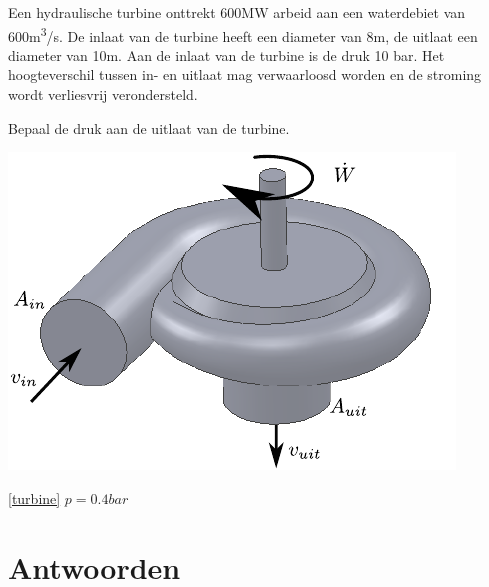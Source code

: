 \begin{toepassing}[*]
	\label{turbine}
Een hydraulische turbine onttrekt 600MW arbeid aan een waterdebiet van 600\unit{m^3/s}. De inlaat van de turbine heeft een diameter van 8m, de uitlaat een diameter van 10m. Aan de inlaat van de turbine is de druk 10 bar. Het hoogteverschil tussen in- en uitlaat mag verwaarloosd worden en de stroming wordt verliesvrij verondersteld.

Bepaal de druk aan de uitlaat van de turbine.

	\centering
	\includegraphics{fig/behoudsvergelijkingen/turbine}
\end{toepassing}
\begin{antwoord}{\ref{turbine}}
	$p = 0.4\unit{bar}$
\end{antwoord}

\section*{Antwoorden}
	\begin{multicols}{2}
	\end{multicols}